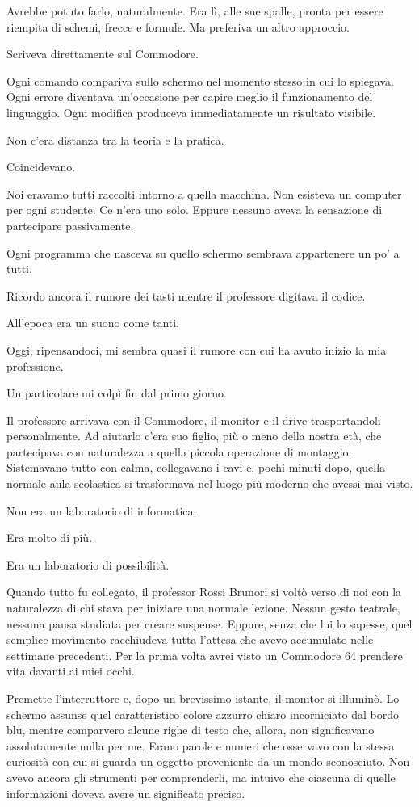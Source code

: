 \documentclass{article}
\begin{document}
Avrebbe potuto farlo, naturalmente. Era lì, alle sue spalle, pronta per essere riempita di schemi, frecce e formule. Ma
preferiva un altro approccio.

Scriveva direttamente sul Commodore.

Ogni comando compariva sullo schermo nel momento stesso in cui lo spiegava. Ogni errore diventava un'occasione per
capire meglio il funzionamento del linguaggio. Ogni modifica produceva immediatamente un risultato visibile.

Non c'era distanza tra la teoria e la pratica.

Coincidevano.

Noi eravamo tutti raccolti intorno a quella macchina. Non esisteva un computer per ogni studente. Ce n'era uno solo.
Eppure nessuno aveva la sensazione di partecipare passivamente.

Ogni programma che nasceva su quello schermo sembrava appartenere un po' a tutti.

Ricordo ancora il rumore dei tasti mentre il professore digitava il codice.

All'epoca era un suono come tanti.

Oggi, ripensandoci, mi sembra quasi il rumore con cui ha avuto inizio la mia professione.

Un particolare mi colpì fin dal primo giorno.

Il professore arrivava con il Commodore, il monitor e il drive trasportandoli personalmente. Ad aiutarlo c'era suo
figlio, più o meno della nostra età, che partecipava con naturalezza a quella piccola operazione di montaggio.
Sistemavano tutto con calma, collegavano i cavi e, pochi minuti dopo, quella normale aula scolastica si trasformava nel
luogo più moderno che avessi mai visto.

Non era un laboratorio di informatica.

Era molto di più.

Era un laboratorio di possibilità.

Quando tutto fu collegato, il professor Rossi Brunori si voltò verso di noi con la naturalezza di chi stava per iniziare
una normale lezione. Nessun gesto teatrale, nessuna pausa studiata per creare suspense. Eppure, senza che lui lo
sapesse, quel semplice movimento racchiudeva tutta l'attesa che avevo accumulato nelle settimane precedenti. Per la
prima volta avrei visto un Commodore 64 prendere vita davanti ai miei occhi.

Premette l'interruttore e, dopo un brevissimo istante, il monitor si illuminò. Lo schermo assunse quel caratteristico
colore azzurro chiaro incorniciato dal bordo blu, mentre comparvero alcune righe di testo che, allora, non
significavano assolutamente nulla per me. Erano parole e numeri che osservavo con la stessa curiosità con cui si guarda
un oggetto proveniente da un mondo sconosciuto. Non avevo ancora gli strumenti per comprenderli, ma intuivo che
ciascuna di quelle informazioni doveva avere un significato preciso.
\end{document}
